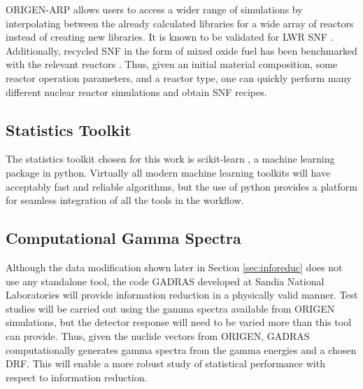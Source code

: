 \gls{ORIGEN-ARP} allows users to access a wider range of simulations by
interpolating between the already calculated libraries for a wide array of
reactors instead of creating new libraries.  It is known to be validated for
\gls{LWR} \gls{SNF} \cite{lwr_valid}. Additionally, recycled \gls{SNF} in the
form of mixed oxide fuel has been benchmarked with the relevant reactors
\cite{mox_valid}.  Thus, given an initial material composition, some reactor
operation parameters, and a reactor type, one can quickly perform many
different nuclear reactor simulations and obtain \gls{SNF} recipes.

\subsection{Statistics Toolkit}

The statistics toolkit chosen for this work is scikit-learn \cite{scikit}, a
machine learning package in python.  Virtually all modern machine learning
toolkits will have acceptably fast and reliable algorithms, but the use of
python provides a platform for seamless integration of all the tools in the
workflow. 

\subsection{Computational Gamma Spectra}

Although the data modification shown later in Section \ref{sec:inforeduc} does
not use any standalone tool, the code \gls{GADRAS} \cite{gadras} developed at
Sandia National Laboratories will provide information reduction in a physically
valid manner.  Test studies will be carried out using the gamma spectra
available from \gls{ORIGEN} simulations, but the detector response will need to
be varied more than this tool can provide. Thus, given the nuclide vectors from
\gls{ORIGEN}, \gls{GADRAS} computationally generates gamma spectra from the
gamma energies and a chosen \gls{DRF}. This will enable a more robust study of 
statistical performance with respect to information reduction.

